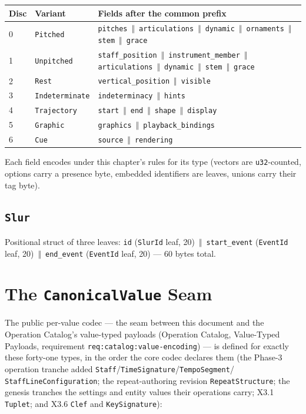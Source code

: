 \documentclass[11pt,letterpaper]{report}
\newcommand{\tablenums}[1]{{\addfontfeatures{Numbers={Lining,Tabular}}#1}}
\newcommand{\sectionsc}[1]{{\addfontfeatures{Letters=SmallCaps}#1}}
\newcounter{requirement}[chapter]
\newcommand{\cat}{\ensuremath{\,\Vert\,}}
\begin{document}
\begingroup\small
\begin{longtable}{p{0.35in} p{1.35in} p{3.8in}}
  \toprule
  \textbf{Disc} & \textbf{Variant} & \textbf{Fields after the common prefix} \\
  \midrule
  \endhead
  \tablenums{0} & \texttt{Pitched} &
    \texttt{pitches} \cat{} \texttt{articulations} \cat{} \texttt{dynamic}
    \cat{} \texttt{ornaments} \cat{} \texttt{stem} \cat{} \texttt{grace} \\
  \tablenums{1} & \texttt{Unpitched} &
    \texttt{staff\_position} \cat{} \texttt{instrument\_member} \cat{}
    \texttt{articulations} \cat{} \texttt{dynamic} \cat{} \texttt{stem}
    \cat{} \texttt{grace} \\
  \tablenums{2} & \texttt{Rest} &
    \texttt{vertical\_position} \cat{} \texttt{visible} \\
  \tablenums{3} & \texttt{Indeterminate} &
    \texttt{indeterminacy} \cat{} \texttt{hints} \\
  \tablenums{4} & \texttt{Trajectory} &
    \texttt{start} \cat{} \texttt{end} \cat{} \texttt{shape} \cat{}
    \texttt{display} \\
  \tablenums{5} & \texttt{Graphic} &
    \texttt{graphics} \cat{} \texttt{playback\_bindings} \\
  \tablenums{6} & \texttt{Cue} &
    \texttt{source} \cat{} \texttt{rendering} \\
  \bottomrule
\end{longtable}
\endgroup

Each field encodes under this chapter's rules for its type (vectors are
\texttt{u32}-counted, options carry a presence byte, embedded identifiers are
leaves, unions carry their tag byte).

\subsection{\texttt{Slur}}
Positional struct of three leaves: \texttt{id} (\texttt{SlurId} leaf, 20)
\cat{} \texttt{start\_event} (\texttt{EventId} leaf, 20) \cat{}
\texttt{end\_event} (\texttt{EventId} leaf, 20) --- 60 bytes total.

\section{The \texttt{CanonicalValue} Seam}
\label{sec:values:canonical-value}

The public per-value codec --- the seam between this document and the
Operation Catalog's value-typed payloads (Operation Catalog,
\sectionsc{Value-Typed Payloads}, requirement
\texttt{req:catalog:value-encoding}) --- is defined for exactly these
forty-one types, in the order the core codec declares them (the Phase-3
operation tranche added \texttt{Staff}/\texttt{TimeSignature}/\texttt{TempoSegment}/%
\texttt{StaffLineConfiguration}; the repeat-authoring revision
\texttt{RepeatStructure}; the genesis tranches the settings and entity values
their operations carry; X3.1 \texttt{Tuplet}; and X3.6 \texttt{Clef} and
\texttt{KeySignature}):
\end{document}
